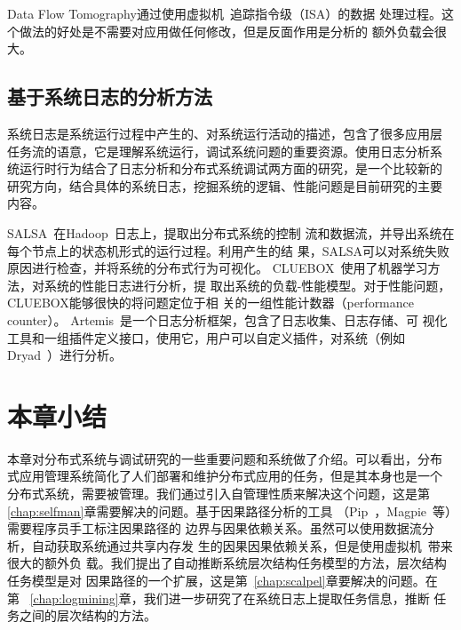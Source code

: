 Data Flow Tomography通过使用虚拟机~\cite{qemu}追踪指令级（ISA）的数据
处理过程。这个做法的好处是不需要对应用做任何修改，但是反面作用是分析的
额外负载会很大。


\subsection{基于系统日志的分析方法}
\label{related:debug:log}


系统日志是系统运行过程中产生的、对系统运行活动的描述，包含了很多应用层
任务流的语意，它是理解系统运行，调试系统问题的重要资源。使用日志分析系
统运行时行为结合了日志分析和分布式系统调试两方面的研究，是一个比较新的
研究方向，结合具体的系统日志，挖掘系统的逻辑、性能问题是目前研究的主要
内容。

SALSA~\cite{salsa}在Hadoop~\cite{hadoop}日志上，提取出分布式系统的控制
流和数据流，并导出系统在每个节点上的状态机形式的运行过程。利用产生的结
果，SALSA可以对系统失败原因进行检查，并将系统的分布式行为可视化。
CLUEBOX~\cite{cluebox}使用了机器学习方法，对系统的性能日志进行分析，提
取出系统的负载-性能模型。对于性能问题，CLUEBOX能够很快的将问题定位于相
关的一组性能计数器（performance counter）。
Artemis~\cite{artemis}是一个日志分析框架，包含了日志收集、日志存储、可
视化工具和一组插件定义接口，使用它，用户可以自定义插件，对系统（例如
Dryad~\cite{dryad}）进行分析。

\section{本章小结}

本章对分布式系统与调试研究的一些重要问题和系统做了介绍。可以看出，分布
式应用管理系统简化了人们部署和维护分布式应用的任务，但是其本身也是一个
分布式系统，需要被管理。我们通过引入自管理性质来解决这个问题，这是第~
\ref{chap:selfman}章需要解决的问题。基于因果路径分析的工具
（Pip~\cite{pip}，Magpie~\cite{magpie}等）需要程序员手工标注因果路径的
边界与因果依赖关系。虽然可以使用数据流分析，自动获取系统通过共享内存发
生的因果因果依赖关系，但是使用虚拟机~\cite{qemu}带来很大的额外负
载。我们提出了自动推断系统层次结构任务模型的方法，层次结构任务模型是对
因果路径的一个扩展，这是第~\ref{chap:scalpel}章要解决的问题。在第~
\ref{chap:logmining}章，我们进一步研究了在系统日志上提取任务信息，推断
任务之间的层次结构的方法。
